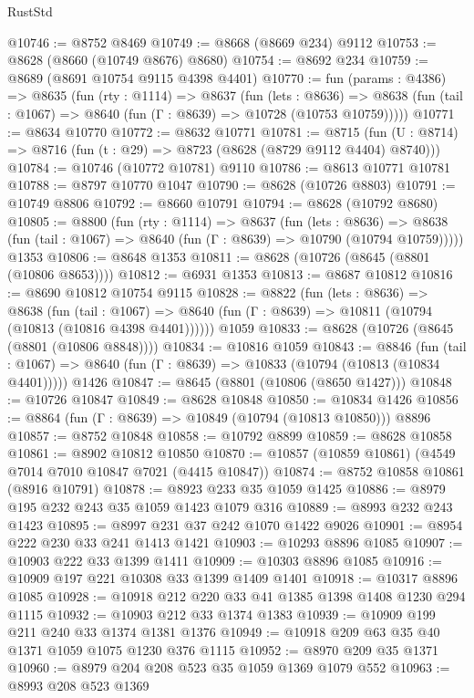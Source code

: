 \begin{lexlean}{RustStd}
\begin{coremodule}
@10746 := @8752 @8469
@10749 := @8668 (@8669 @234) @9112
@10753 := @8628 (@8660 (@10749 @8676) @8680)
@10754 := @8692 @234
@10759 := @8689 (@8691 @10754 @9115 @4398 @4401)
@10770 := fun (params : @4386) =>
  @8635
    (fun (rty : @1114) =>
    @8637
      (fun (lets : @8636) =>
      @8638 (fun (tail : @1067) => @8640 (fun (Γ : @8639) => @10728 (@10753 @10759)))))
@10771 := @8634 @10770
@10772 := @8632 @10771
@10781 := @8715
    (fun (U : @8714) => @8716 (fun (t : @29) => @8723 (@8628 (@8729 @9112 @4404) @8740)))
@10784 := @10746 (@10772 @10781) @9110
@10786 := @8613 @10771 @10781
@10788 := @8797 @10770 @1047
@10790 := @8628 (@10726 @8803)
@10791 := @10749 @8806
@10792 := @8660 @10791
@10794 := @8628 (@10792 @8680)
@10805 := @8800
    (fun (rty : @1114) =>
    @8637
      (fun (lets : @8636) =>
      @8638 (fun (tail : @1067) => @8640 (fun (Γ : @8639) => @10790 (@10794 @10759)))))
    @1353
@10806 := @8648 @1353
@10811 := @8628 (@10726 (@8645 (@8801 (@10806 @8653))))
@10812 := @6931 @1353
@10813 := @8687 @10812
@10816 := @8690 @10812 @10754 @9115
@10828 := @8822
    (fun (lets : @8636) =>
    @8638
      (fun (tail : @1067) =>
      @8640 (fun (Γ : @8639) => @10811 (@10794 (@10813 (@10816 @4398 @4401))))))
    @1059
@10833 := @8628 (@10726 (@8645 (@8801 (@10806 @8848))))
@10834 := @10816 @1059
@10843 := @8846
    (fun (tail : @1067) => @8640 (fun (Γ : @8639) => @10833 (@10794 (@10813 (@10834 @4401)))))
    @1426
@10847 := @8645 (@8801 (@10806 (@8650 @1427)))
@10848 := @10726 @10847
@10849 := @8628 @10848
@10850 := @10834 @1426
@10856 := @8864 (fun (Γ : @8639) => @10849 (@10794 (@10813 @10850))) @8896
@10857 := @8752 @10848
@10858 := @10792 @8899
@10859 := @8628 @10858
@10861 := @8902 @10812 @10850
@10870 := @10857 (@10859 @10861) (@4549 @7014 @7010 @10847 @7021 (@4415 @10847))
@10874 := @8752 @10858 @10861 (@8916 @10791)
@10878 := @8923 @233 @35 @1059 @1425
@10886 := @8979 @195 @232 @243 @35 @1059 @1423 @1079 @316
@10889 := @8993 @232 @243 @1423
@10895 := @8997 @231 @37 @242 @1070 @1422 @9026
@10901 := @8954 @222 @230 @33 @241 @1413 @1421
@10903 := @10293 @8896 @1085
@10907 := @10903 @222 @33 @1399 @1411
@10909 := @10303 @8896 @1085
@10916 := @10909 @197 @221 @10308 @33 @1399 @1409 @1401
@10918 := @10317 @8896 @1085
@10928 := @10918 @212 @220 @33 @41 @1385 @1398 @1408 @1230 @294 @1115
@10932 := @10903 @212 @33 @1374 @1383
@10939 := @10909 @199 @211 @240 @33 @1374 @1381 @1376
@10949 := @10918 @209 @63 @35 @40 @1371 @1059 @1075 @1230 @376 @1115
@10952 := @8970 @209 @35 @1371
@10960 := @8979 @204 @208 @523 @35 @1059 @1369 @1079 @552
@10963 := @8993 @208 @523 @1369

\end{coremodule}
\end{lexlean}
